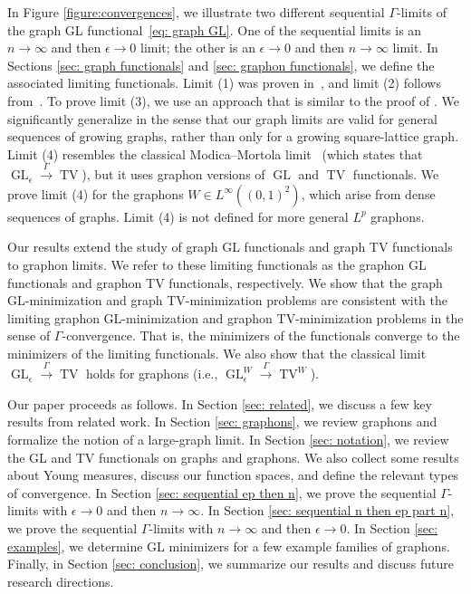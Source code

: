 \documentclass[11pt]{amsart}
\def\ep{\epsilon}
\def\ra{\rightarrow}
\def\gamra{\stackrel{\Gamma}{\longrightarrow}}
\def\GL{\operatorname{GL}}
\def\TV{\operatorname{TV}}
\numberwithin{equation}{section}
\begin{document}
In Figure \ref{figure:convergences}, we illustrate two different sequential $\Gamma$-limits of the graph GL functional~\eqref{eq: graph GL}. One of the sequential limits is an $n \ra \infty$ and then $\ep \ra 0$ limit; the other is an $\ep \ra 0$ and then $n \ra \infty$ limit. In Sections \ref{sec: graph functionals} and \ref{sec: graphon functionals}, we define the associated limiting functionals. Limit (1) was proven in~\cite[Theorem 3.1]{van2012gamma}, and limit (2) follows from~\cite[Theorem 12]{braides2020cut}. To prove limit (3), we use an approach that is similar to the proof of \cite[Theorem 12]{braides2020cut}. We significantly generalize {\cite[Theorem 5.2]{van2012gamma}} in the sense that our graph limits {are valid for} general sequences of growing graphs, rather than only for a growing square-lattice graph. Limit (4) resembles the classical {Modica--Mortola} limit~\cite{modica1977esempio} (which states that $\GL_\ep \gamra {\TV}$), but it uses
graphon versions of $\GL$ and $\TV$ functionals. We prove limit (4) for {the graphons $W \in L^\infty((0,1)^2)$, which arise from dense sequences of graphs.} Limit (4) is not defined for more general $L^p$ graphons. 

Our results extend the study of graph GL {functionals} and {graph} TV functionals to graphon limits. We refer to these limiting functionals as the graphon GL {functionals} and {graphon} TV functionals, respectively. We show that the {graph GL-minimization and graph TV-minimization problems are consistent with the limiting graphon GL-minimization and graphon TV-minimization problems in the sense of $\Gamma$-convergence.} That is, the minimizers of the functionals converge to the minimizers of the limiting functionals. We also show that the classical limit $\GL_\ep \gamra {\TV}$ holds for graphons (i.e., $\GL^W_\ep \gamra {\TV^W}$). 

Our paper proceeds as follows. In Section \ref{sec: related}, we discuss a few key results from related work. In Section \ref{sec: graphons}, we review graphons and formalize the notion of a large-graph limit. In Section \ref{sec: notation}, we review the GL and TV functionals on graphs and graphons. We also collect some results about Young measures, discuss our function spaces, and define the relevant types of convergence. In Section \ref{sec: sequential ep then n}, we prove the sequential $\Gamma$-limits with $\ep \ra 0$ and then $n \ra \infty$. In Section \ref{sec: sequential n then ep part n}, we prove the sequential $\Gamma$-limits with $n \ra \infty$ and then $\ep \ra 0$. In Section \ref{sec: examples}, we {determine} GL minimizers for a few example families of graphons. Finally, in Section \ref{sec: conclusion}, we summarize our results and discuss future research directions.
\end{document}
